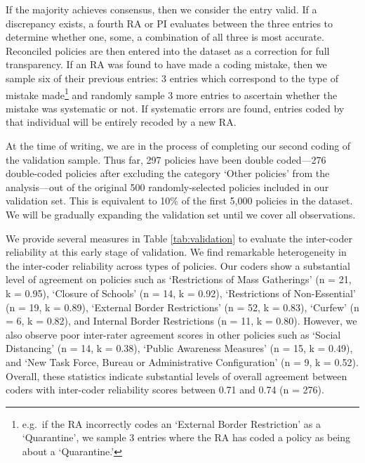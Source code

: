 \documentclass[]{article}
\let\rmarkdownfootnote\footnote%
\def\footnote{\protect\rmarkdownfootnote}
\begin{document}
If the majority achieves consensus, then we consider the entry valid. If a discrepancy exists, a fourth RA or PI evaluates between the three entries to determine whether one, some, a combination of all three is most accurate. Reconciled policies are then entered into the dataset as a correction for full transparency. If an RA was found to have made a coding mistake, then we sample six of their previous entries: 3 entries which correspond to the type of mistake made\footnote{e.g.~if the RA incorrectly codes an `External Border Restriction' as a `Quarantine', we sample 3 entries where the RA has coded a policy as being about a `Quarantine.'} and randomly sample 3 more entries to ascertain whether the mistake was systematic or not. If systematic errors are found, entries coded by that individual will be entirely recoded by a new RA.

At the time of writing, we are in the process of completing our second coding of the validation sample. Thus far, 297 policies have been double coded---276 double-coded policies after excluding the category `Other policies' from the analysis---out of the original 500 randomly-selected policies included in our validation set. This is equivalent to 10\% of the first 5,000 policies in the dataset. We will be gradually expanding the validation set until we cover all observations.

We provide several measures in Table \ref{tab:validation} to evaluate the inter-coder reliability at this early stage of validation. We find remarkable heterogeneity in the inter-coder reliability across types of policies. Our coders show a substantial level of agreement on policies such as `Restrictions of Mass Gatherings' (n = 21, k = 0.95), `Closure of Schools' (n = 14, k = 0.92), `Restrictions of Non-Essential' (n = 19, k = 0.89), `External Border Restrictions' (n = 52, k = 0.83), `Curfew' (n = 6, k = 0.82), and Internal Border Restrictions (n = 11, k = 0.80). However, we also observe poor inter-rater agreement scores in other policies such as `Social Distancing' (n = 14, k = 0.38), `Public Awareness Measures' (n = 15, k = 0.49), and `New Task Force, Bureau or Administrative Configuration' (n = 9, k = 0.52). Overall, these statistics indicate substantial levels of overall agreement between coders with inter-coder reliability scores between 0.71 and 0.74 (n = 276).
\end{document}
